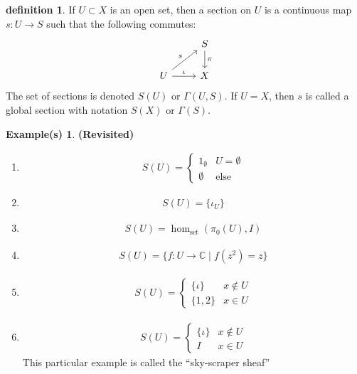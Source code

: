 \documentclass[10.5pt]{article}
\theoremstyle{definition}
\newtheorem{definition}{definition}
\newtheorem*{example}{Example(s)}
\newcommand{\set}[1]{\{#1\}}
\newcommand{\tor}{\text{ or }}
\begin{document}
    \begin{definition}
        If \(U \subset X\) is an open set, then a section on \(U\) is a continuous map \(s: U \to S\) such that the following commutes:
        \begin{equation*}
            \begin{tikzcd}
                &S \arrow[d,"{\pi}"] \\
                U \arrow[ru,"{s}"] \arrow[r,"{\iota}"] &X
            \end{tikzcd}
        \end{equation*}
        The set of sections is denoted \(S(U) \tor \Gamma(U,S)\). If \(U = X\), then \(s\) is called a global section with notation \(S(X)\) or \(\Gamma(S)\).
    \end{definition}

    \begin{example}\textbf{(Revisited)}
        \begin{enumerate}
            \item \begin{align*}
                S(U) = \begin{cases}
                    1_\emptyset & U = \emptyset \\
                    \emptyset & \text{else}
                \end{cases}
            \end{align*}
            \item \begin{align*}
                S(U) = \set{\iota_U}
            \end{align*}
            \item \begin{align*}
                S(U) = \hom_\text{set}(\pi_0(U),I)
            \end{align*}
            \item \begin{align*}
                S(U) = \set{f: U \to \mathbb{C} \mid f(z^2) = z}
            \end{align*}
            \item \begin{align*}
                S(U) = \begin{cases}
                    \set{\iota} & x \not \in U \\ \set{1,2} & x \in U
                \end{cases}
            \end{align*}
            \item \begin{align*}
                S(U) = \begin{cases}
                    \set{\iota} & x \not \in U \\ I & x \in U
                \end{cases}
            \end{align*}
            This particular example is called the ``sky-scraper sheaf''
        \end{enumerate}
    \end{example}
\end{document}
